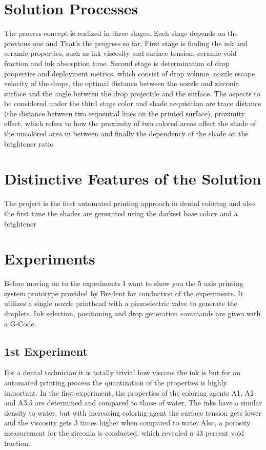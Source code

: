 \chapter{Solution Processes}
\label{sec:Lösungsprozesse}
The process concept is realized in three stages. Each stage depends on the previous one and That’s the progress so far. First stage is finding the ink and ceramic properties, such as ink viscosity and surface tension, ceramic void fraction and ink absorption time. Second stage is determination of drop properties and deployment metrics, which consist of drop volume, nozzle escape velocity of the drops, the optimal distance between the nozzle and zirconia surface and the angle between the drop projectile and the surface. The aspects to be considered under the third stage color and shade acquisition are trace distance (the distance between two sequential lines on the printed surface), proximity effect, which refers to how the proximity of two colored areas affect the shade of the uncolored area in between and finally the dependency of the shade on the brightener ratio


\chapter{Distinctive Features of the Solution}
\label{sec:Unterscheidungsmerkmale}
The project is the first automated printing approach in dental coloring and also the first time the shades are generated using the darkest base colors and a brightener

\chapter{Experiments}

Before moving on to the experiments I want to show you the 5 axis printing system prototype provided by Bredent for conduction of the experiments. 
It utilizes a single nozzle printhead  with a piezoelectric valve to generate the droplets. Ink selection, positioning and drop generation commands are given with a G-Code.

\section{1st Experiment}
For a dental technician it is totally trivial how viscous the ink is but for an automated printing  process the quantization of the properties is highly important. In the first experiment, the properties of the coloring agents A1, A2 and A3.5 are determined and compared to those of water. The inks have a similar density to water, but with increasing coloring agent the surface tension gets lower and the viscosity gets 3 times higher when compared to water.Also, a porosity measurement for the zirconia is conducted, which revealed a 43 percent void fraction.

